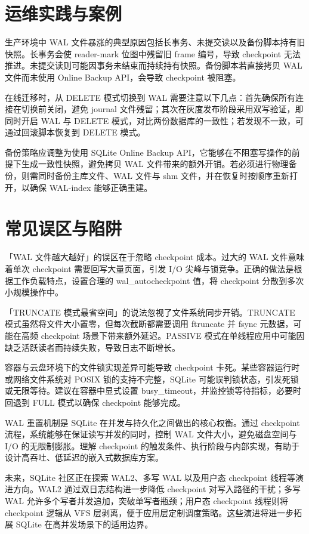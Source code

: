 \chapter{运维实践与案例}
生产环境中 WAL 文件暴涨的典型原因包括长事务、未提交读以及备份脚本持有旧快照。长事务会使 reader-mark 位图中残留旧 frame 编号，导致 checkpoint 无法推进。未提交读则可能因事务未结束而持续持有快照。备份脚本若直接拷贝 WAL 文件而未使用 Online Backup API，会导致 checkpoint 被阻塞。\par
在线迁移时，从 DELETE 模式切换到 WAL 需要注意以下几点：首先确保所有连接在切换前关闭，避免 journal 文件残留；其次在灰度发布阶段采用双写验证，即同时开启 WAL 与 DELETE 模式，对比两份数据库的一致性；若发现不一致，可通过回滚脚本恢复到 DELETE 模式。\par
备份策略应调整为使用 SQLite Online Backup API，它能够在不阻塞写操作的前提下生成一致性快照，避免拷贝 WAL 文件带来的额外开销。若必须进行物理备份，则需同时备份主库文件、WAL 文件与 shm 文件，并在恢复时按顺序重新打开，以确保 WAL-index 能够正确重建。\par
\chapter{常见误区与陷阱}
「WAL 文件越大越好」的误区在于忽略 checkpoint 成本。过大的 WAL 文件意味着单次 checkpoint 需要回写大量页面，引发 I/O 尖峰与锁竞争。正确的做法是根据工作负载特点，设置合理的 wal\_{}autocheckpoint 值，将 checkpoint 分散到多次小规模操作中。\par
「TRUNCATE 模式最省空间」的说法忽视了文件系统同步开销。TRUNCATE 模式虽然将文件大小置零，但每次截断都需要调用 ftruncate 并 fsync 元数据，可能在高频 checkpoint 场景下带来额外延迟。PASSIVE 模式在单线程应用中可能因缺乏活跃读者而持续失败，导致日志不断增长。\par
容器与云盘环境下的文件锁实现差异可能导致 checkpoint 卡死。某些容器运行时或网络文件系统对 POSIX 锁的支持不完整，SQLite 可能误判锁状态，引发死锁或无限等待。建议在容器中显式设置 busy\_{}timeout，并监控锁等待指标，必要时回退到 FULL 模式以确保 checkpoint 能够完成。\par
WAL 重置机制是 SQLite 在并发与持久化之间做出的核心权衡。通过 checkpoint 流程，系统能够在保证读写并发的同时，控制 WAL 文件大小，避免磁盘空间与 I/O 的无限制膨胀。理解 checkpoint 的触发条件、执行阶段与内部实现，有助于设计高吞吐、低延迟的嵌入式数据库方案。\par
未来，SQLite 社区正在探索 WAL2、多写 WAL 以及用户态 checkpoint 线程等演进方向。WAL2 通过双日志结构进一步降低 checkpoint 对写入路径的干扰；多写 WAL 允许多个写者并发追加，突破单写者瓶颈；用户态 checkpoint 线程则将 checkpoint 逻辑从 VFS 层剥离，便于应用层定制调度策略。这些演进将进一步拓展 SQLite 在高并发场景下的适用边界。\par

